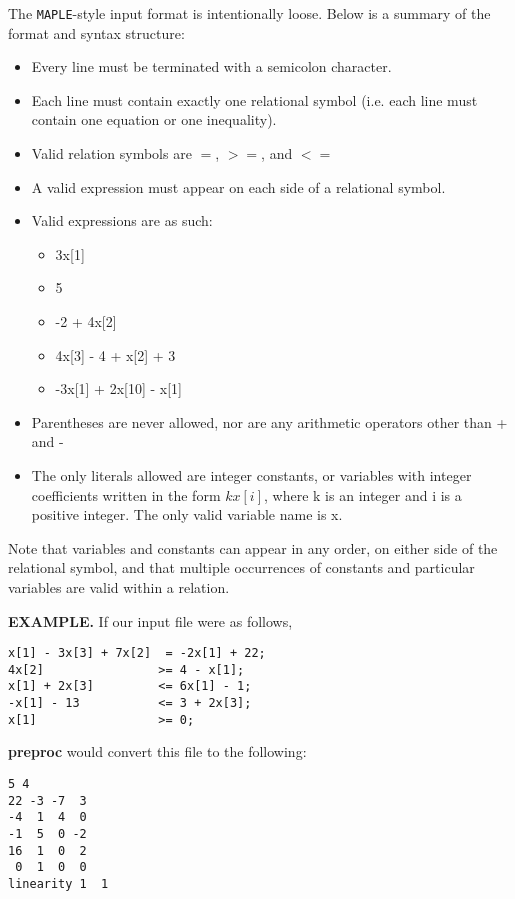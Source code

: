 
The {\tt MAPLE}-style input format is intentionally loose.
Below is a summary of the format and syntax structure:
\begin{itemize}
\item Every line must be terminated with a semicolon character.
\item Each line must contain exactly one relational symbol
(i.e. each line must contain one equation or one inequality).
\item Valid relation symbols are $=$, $>=$, and $<=$
\item A valid expression must appear on each side of a relational symbol.
\item Valid expressions are as such:
	\begin{itemize}
	\item \hspace{1 cm} 3x[1]
	\item \hspace{1 cm} 5
	\item \hspace{1 cm} -2 + 4x[2]
	\item \hspace{1 cm} 4x[3] - 4 + x[2] + 3
	\item \hspace{1 cm} -3x[1] + 2x[10] - x[1]
	\end{itemize}
\item Parentheses are never allowed, nor are any arithmetic operators
  other than + and -
\item The only literals allowed are integer constants, or variables
  with integer coefficients written in the form
$kx[i]$, where k is an integer and i is a positive integer.  The only
  valid variable name is x.
\end{itemize}
Note that variables and constants can appear in any order, on either
side of the relational symbol, and that multiple occurrences of
constants and particular variables are valid within a relation. 

\textbf{EXAMPLE.}
If our input file were as follows,
\begin{verbatim}
x[1] - 3x[3] + 7x[2]  = -2x[1] + 22;
4x[2]                >= 4 - x[1];
x[1] + 2x[3]         <= 6x[1] - 1;
-x[1] - 13           <= 3 + 2x[3];
x[1]                 >= 0;
\end{verbatim}
\textbf{preproc} would convert this file to the following:
\begin{verbatim}
5 4
22 -3 -7  3
-4  1  4  0
-1  5  0 -2
16  1  0  2
 0  1  0  0
linearity 1  1
\end{verbatim}

